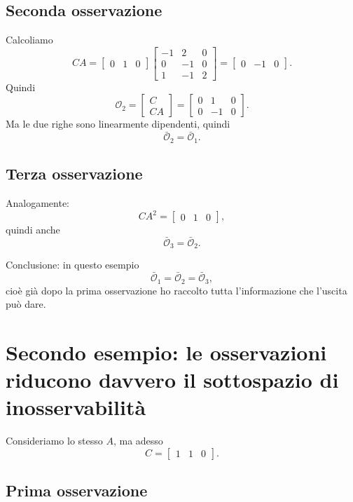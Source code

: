 \subsection{Seconda osservazione}

Calcoliamo
\[
CA=
\begin{bmatrix}
0 & 1 & 0
\end{bmatrix}
\begin{bmatrix}
-1 & 2 & 0\\
0 & -1 & 0\\
1 & -1 & 2
\end{bmatrix}
=
\begin{bmatrix}
0 & -1 & 0
\end{bmatrix}.
\]
Quindi
\[
\mathcal O_2=
\begin{bmatrix}
C\\
CA
\end{bmatrix}
=
\begin{bmatrix}
0 & 1 & 0\\
0 & -1 & 0
\end{bmatrix}.
\]
Ma le due righe sono linearmente dipendenti, quindi
\[
\bar{\mathcal O}_2=\bar{\mathcal O}_1.
\]

\subsection{Terza osservazione}

Analogamente:
\[
CA^2=
\begin{bmatrix}
0 & 1 & 0
\end{bmatrix},
\]
quindi anche
\[
\bar{\mathcal O}_3=\bar{\mathcal O}_2.
\]

\medskip

Conclusione: in questo esempio
\[
\bar{\mathcal O}_1=\bar{\mathcal O}_2=\bar{\mathcal O}_3,
\]
cioè già dopo la prima osservazione ho raccolto tutta l'informazione che l'uscita può dare.

\section{Secondo esempio: le osservazioni riducono davvero il sottospazio di inosservabilità}

Consideriamo lo stesso \(A\), ma adesso
\[
C=
\begin{bmatrix}
1 & 1 & 0
\end{bmatrix}.
\]

\subsection{Prima osservazione}


